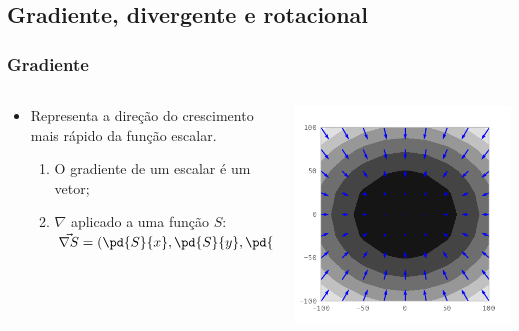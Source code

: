 \subsection{Gradiente, divergente e rotacional}
\begin{frame}
\frametitle{Gradiente}

  \begin{columns}
    \begin{column}{0.5\textwidth}
        \begin{itemize}[<+-| alert@+>]
          \item Representa a direção do crescimento mais rápido da função
                escalar.
            \begin{enumerate}[<+-| alert@+>]
              \item O gradiente de um escalar é um vetor;
              \item $\nabla$ aplicado a uma função $S$:
                    $\vec{\nabla S} = \left(\pd{S}{x}, \pd{S}{y}, \pd{S}{z}
                    \right)$
            \end{enumerate}
        \end{itemize}
    \end{column}
  \pause
    \begin{column}{0.5\textwidth}
      \begin{center}
        \includegraphics[scale=0.55]{./figures/gradient.png}
      \end{center}
    \end{column}
  \end{columns}

\end{frame}


